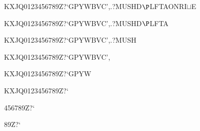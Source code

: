 \documentclass[12pt]{article}
\begin{document}
\begin{tt}
\begin{small}
\begin{bundle}{}
{\begin{bundle}{KXJQ0123456789Z?`GPYWBVC',.?MUSHD$\P$LFTAONRI$\sqcup$E}
{\begin{bundle}{KXJQ0123456789Z?`GPYWBVC',.?MUSHD$\P$LFTA}
{\begin{bundle}{KXJQ0123456789Z?`GPYWBVC',.?MUSH}
{\begin{bundle}{KXJQ0123456789Z?`GPYWBVC',}
{\begin{bundle}{KXJQ0123456789Z?`GPYW}
{\begin{bundle}{KXJQ0123456789Z?`}
{\begin{bundle}{456789Z?`}
{\begin{bundle}{89Z?`}
\end{bundle}}
\end{bundle}}
\end{bundle}}
\end{bundle}}
\end{bundle}}
\end{bundle}}
\end{bundle}}
\end{bundle}}
\end{bundle}
\end{small}
\end{tt}
\end{document}
